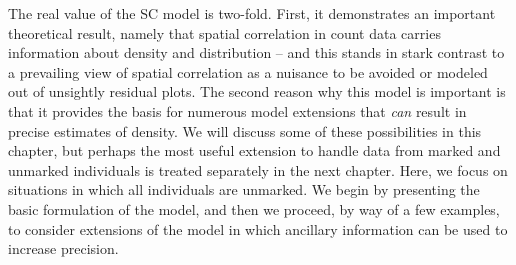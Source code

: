 The real value of the SC model is two-fold. First, it demonstrates
an important theoretical result, namely
that spatial correlation in
count data carries information about density and distribution -- and this
stands in stark contrast to a prevailing view of
spatial correlation as a nuisance to be avoided or modeled out of unsightly
residual plots. The second reason why this model is important is that
it provides the basis for numerous model extensions that \textit{can}
result in precise estimates of density. %
We will discuss some of
these possibilities in this chapter, but
perhaps the most useful extension %
to handle data from marked and unmarked
individuals is treated separately in the next chapter. Here, we focus
on situations in which all individuals are unmarked.
We begin by
presenting the basic formulation of the model, and then we proceed, by
way of a few examples, to consider extensions of the model in which
ancillary information can be used to increase precision.

